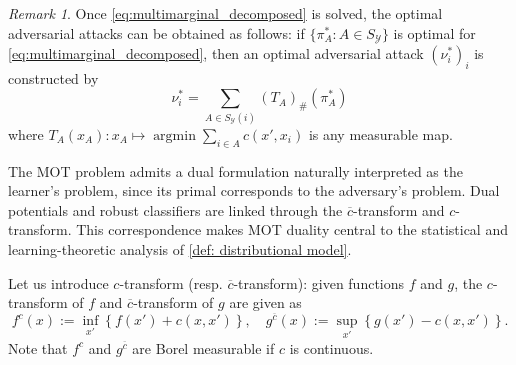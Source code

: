\documentclass{amsart}
\theoremstyle{plain}
\numberwithin{equation}{section}\newtheorem{theorem}{Theorem}[section]
\theoremstyle{remark}
\newtheorem{remark}[theorem]{Remark}
\DeclareMathOperator*{\argmin}{argmin}
\begin{document}
\begin{remark}
Once \eqref{eq:multimarginal_decomposed} is solved, the optimal adversarial attacks can be obtained as follows: if $\{\pi^*_A : A \in S_\mathcal{Y} \}$ is optimal for \eqref{eq:multimarginal_decomposed}, then an optimal adversarial attack $(\nu^*_i)_{i}$ is constructed by
\[
    \nu^*_i =  \sum_{A\in S_\mathcal{Y}(i)}(T_{A})_\# (\pi^*_A)
\]
where $T_A(x_A) : x_A \mapsto \argmin \sum_{i\in A} c(x', x_i)$ is any measurable map.    
\end{remark}





The MOT problem admits a dual formulation naturally interpreted as the learner’s problem, since its primal corresponds to the adversary’s problem. Dual potentials and robust classifiers are linked through the $\overline{c}$-transform and $c$-transform. This correspondence makes MOT duality central to the statistical and learning-theoretic analysis of \eqref{def: distributional model}.







Let us introduce $c$-transform (resp. $\overline{c}$-transform): given functions $f$ and $g$, the $c$-transform of $f$
 and $\overline{c}$-transform of $g$ are given as
 \begin{equation}\label{eq:c_transform}
     f^c(x) := \inf_{x'} \left\{ f(x') + c(x,x') \right\}, \quad g^{\overline{c}}(x):= \sup_{x'} \left\{ g(x') - c(x,x') \right\}.
 \end{equation}
Note that $f^c$ and $g^{\overline{c}}$ are Borel measurable if $c$ is continuous.
\end{document}
